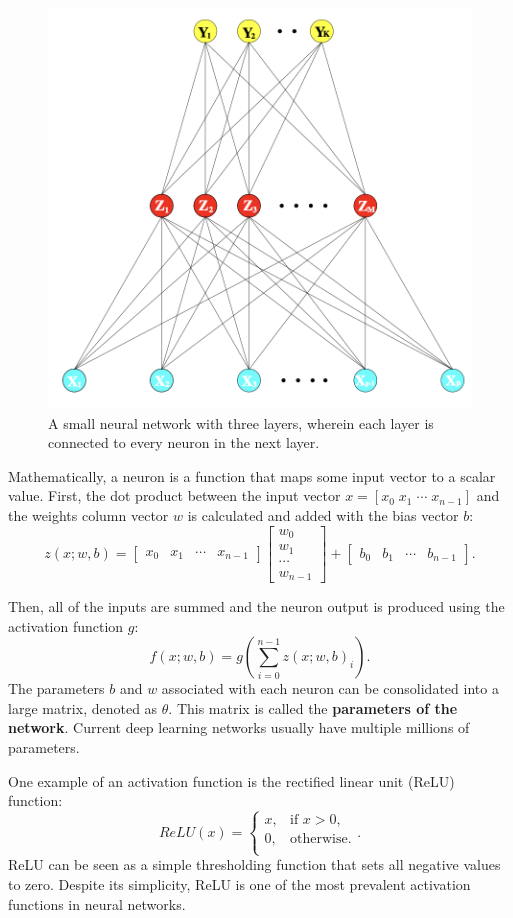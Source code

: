 \begin{figure}[t!]
 \centering
 \includegraphics[width=0.5\linewidth]{images/nn-typical}
 \caption{A small neural network with three layers, wherein each layer is connected to every neuron in the next layer. \cite{hastieElementsStatisticalLearning2009}}
 \label{fig:nn-typical}
 \end{figure}

Mathematically, a neuron is a function that maps some input vector to a scalar value. First, the dot product between the input vector $x = [x_0\; x_1\; \cdots\; x_{n - 1}]$ and the weights column vector $w$ is calculated and added with the bias vector $b$:
\begin{equation}
z(x;w, b) =
\begin{bmatrix}
x_0 & x_1 & \cdots & x_{n - 1}
\end{bmatrix}
\begin{bmatrix}
w_0\\
w_1\\
\cdots\\
w_{n-1}
\end{bmatrix}
+
\begin{bmatrix}
b_0 & b_1 & \cdots & b_{n - 1}
\end{bmatrix}.
\end{equation}

Then, all of the inputs are summed and the neuron output is produced using the activation function $g$:
\begin{equation}
f(x;w,b) = g\left(\sum_{i=0}^{n - 1} z(x;w,b)_i\right).
\end{equation}
The parameters $b$ and $w$ associated with each neuron can be consolidated into a large matrix, denoted as $\theta$. This matrix is called the \textbf{parameters of the network}. Current deep learning networks usually have multiple millions of parameters.

One example of an activation function is the rectified linear unit (ReLU) function:
\begin{equation}
ReLU(x) = 
    \begin{cases}
        x, & \text{if } x > 0,\\
        0, & \text{otherwise.}\\
    \end{cases}.
\end{equation}
ReLU can be seen as a simple thresholding function that sets all negative values to zero. Despite its simplicity, ReLU is one of the most prevalent activation functions in neural networks.

